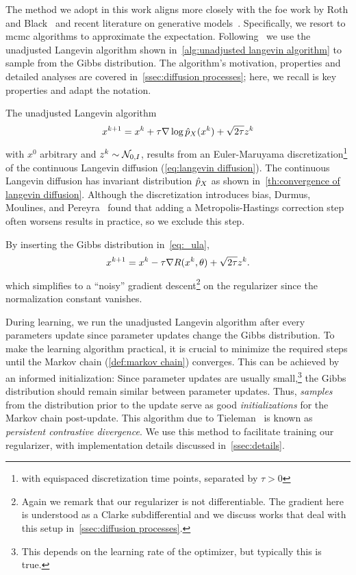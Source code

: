 The method we adopt in this work aligns more closely with the \gls{foe} work by Roth and Black~\cite{RoBl09} and recent literature on generative models~\cite{nijkamp_shortrun_2019,du_implicit_2019}.
Specifically, we resort to \gls{mcmc} algorithms to approximate the expectation.
Following~\cite{nijkamp_shortrun_2019,du_implicit_2019} we use the unadjusted Langevin algorithm shown in~\cref{alg:unadjusted langevin algorithm} to sample from the Gibbs distribution.
The algorithm's motivation, properties and detailed analyses are covered in~\cref{ssec:diffusion processes};
here, we recall is key properties and adapt the notation.

The unadjusted Langevin algorithm
\begin{equation}
	x^{k+\num{1}} = x^k + \tau \nabla \log \hat{p}_{X}(x^k) + \sqrt{\num{2}\tau}z^k
	\label{eq:_ula}
\end{equation}
with \( x^{\num{0}} \) arbitrary and \( z^k \sim \mathcal{N}_{\num{0}, I} \), results from an Euler-Maruyama discretization\footnote{%
	with equispaced discretization time points, separated by \( \tau > \num{0} \)
} of the continuous Langevin diffusion (\cref{eq:langevin diffusion}).
The continuous Langevin diffusion has invariant distribution \( \hat{p}_{X} \) as shown in~\cref{th:convergence of langevin diffusion}.
Although the discretization introduces bias, Durmus, Moulines, and Pereyra~\cite{durmus_efficient_18} found that adding a Metropolis-Hastings correction step often worsens results in practice, so we exclude this step.

By inserting the Gibbs distribution in~\cref{eq:_ula},
\begin{equation}
	x^{k+1} = x^k - \tau \nabla R(x^k, \theta) + \sqrt{\num{2}\tau}z^k.
	\label{eq:ula regularizer}
\end{equation}
which simplifies to a \enquote{noisy} gradient descent\footnote{%
	Again we remark that our regularizer is not differentiable.
	The gradient here is understood as a Clarke subdifferential and we discuss works that deal with this setup in~\cref{ssec:diffusion processes}.
} on the regularizer since the normalization constant vanishes.

During learning, we run the unadjusted Langevin algorithm after every parameters update since parameter updates change the Gibbs distribution.
To make the learning algorithm  practical, it is crucial to minimize the required steps until the Markov chain (\cref{def:markov chain}) converges.
This can be achieved by an informed initialization:
Since parameter updates are usually small,\footnote{%
	This depends on the learning rate of the optimizer, but typically this is true.%
} the Gibbs distribution should remain similar between parameter updates.
Thus, \emph{samples} from the distribution prior to the update serve as good \emph{initializations} for the Markov chain post-update.
This algorithm due to Tieleman~\cite{tieleman_training_2008} is known as \emph{persistent contrastive divergence}.
We use this method to facilitate training our regularizer, with implementation details discussed in~\cref{ssec:details}.
